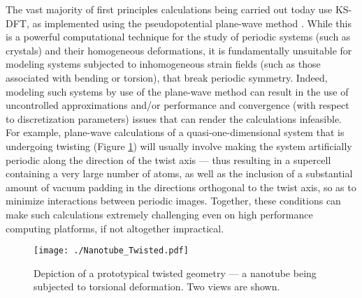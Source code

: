 \documentclass[preprint,12pt, 3p, sort&compress]{elsarticle}
\begin{document}
The vast majority of first principles calculations being carried out today use KS-DFT, as implemented using the pseudopotential plane-wave method \citep{Kresse_abinitio_iterative, Gonze_ABINIT_1, Quantum_Espresso_1, CASTEP_1}. While this is a powerful computational technique for the study of periodic systems (such as crystals) and their homogeneous deformations, it is 
fundamentally unsuitable for modeling systems subjected to inhomogeneous strain fields (such as those associated with bending or torsion), that break periodic symmetry. Indeed, modeling such systems by use of the plane-wave method can result in the use of uncontrolled approximations and/or performance and convergence {(with respect to discretization parameters)} issues that can render the calculations infeasible. For example, plane-wave calculations of  a quasi-one-dimensional system that is undergoing twisting (Figure \ref{fig:Nanotube_Twisted}) will usually involve making the system artificially periodic along the direction of the twist axis --- thus resulting in a supercell containing a very large number of atoms, as well as the inclusion of a substantial amount of vacuum padding in the directions orthogonal to the twist axis, so as to minimize interactions between periodic images. Together, these conditions can make such calculations extremely challenging even on high performance computing platforms, if not altogether impractical.
\begin{figure}[ht]
\centering
{\texttt{[image: ./Nanotube\_Twisted.pdf]}}
\caption{Depiction of a prototypical twisted geometry --- a nanotube being subjected to torsional deformation. Two views are shown.}
\label{fig:Nanotube_Twisted}
\end{figure}
\end{document}
